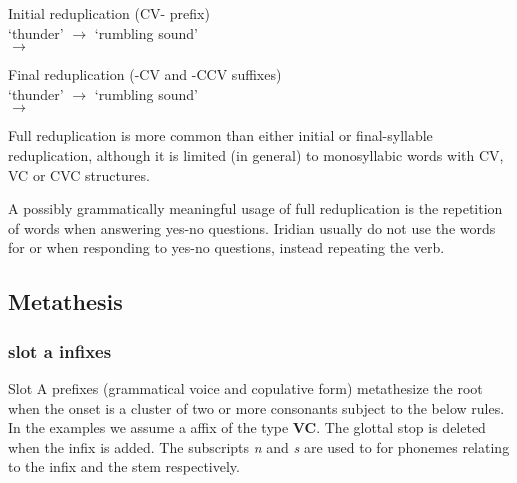\ex Initial reduplication (CV- prefix)\\
 `thunder' 	$\rightarrow$  `rumbling sound'\\
  $\rightarrow$  \\
\xe

\ex Final reduplication (-CV and -CCV suffixes)\\
 `thunder' 	$\rightarrow$  `rumbling sound'\\
  $\rightarrow$  \\
\xe

Full reduplication is more common than either initial or final-syllable reduplication, although it is limited (in general) to monosyllabic words with CV, VC or CVC structures.

A possibly grammatically meaningful usage of full reduplication is the repetition of words when answering yes-no questions. Iridian usually do not use the words for  or  when responding to yes-no questions, instead repeating the verb. 

\subsection{Metathesis}

\subsubsection{slot a infixes}
Slot A prefixes (grammatical voice and copulative form) metathesize the root when the onset is a cluster of two or more consonants subject to the below rules. In the examples we assume a affix of the type \textbf{\glot VC}. The glottal stop is deleted when the infix is added. The subscripts \textit{n} and \textit{s} are used to for phonemes relating to the infix and the stem respectively.

